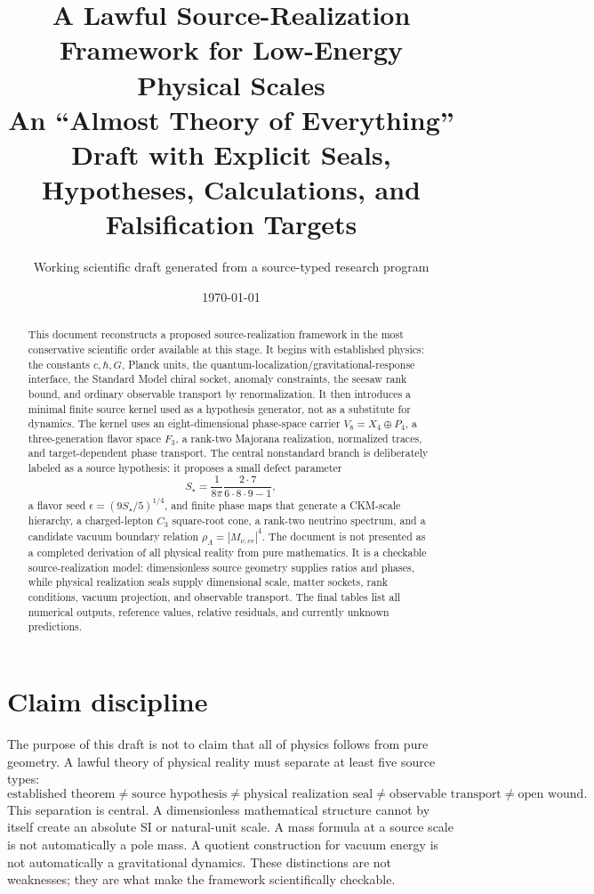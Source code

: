 \documentclass[11pt]{article}
\title{\textbf{A Lawful Source-Realization Framework for Low-Energy Physical Scales}\\
\large An ``Almost Theory of Everything'' Draft with Explicit Seals, Hypotheses, Calculations, and Falsification Targets}
\author{Working scientific draft generated from a source-typed research program}
\date{\today}
\begin{document}
\maketitle

\begin{abstract}
This document reconstructs a proposed source-realization framework in the most conservative scientific order available at this stage. It begins with established physics: the constants \(c,\hbar,G\), Planck units, the quantum-localization/gravitational-response interface, the Standard Model chiral socket, anomaly constraints, the seesaw rank bound, and ordinary observable transport by renormalization. It then introduces a minimal finite source kernel used as a hypothesis generator, not as a substitute for dynamics. The kernel uses an eight-dimensional phase-space carrier \(V_8=X_4\oplus P_4\), a three-generation flavor space \(F_3\), a rank-two Majorana realization, normalized traces, and target-dependent phase transport. The central nonstandard branch is deliberately labeled as a source hypothesis: it proposes a small defect parameter
\[
S_\star=\frac{1}{8\pi}\frac{2\cdot 7}{6\cdot 8\cdot 9-1},
\]
a flavor seed \(\epsilon=(9S_\star/5)^{1/4}\), and finite phase maps that generate a CKM-scale hierarchy, a charged-lepton \(C_3\) square-root cone, a rank-two neutrino spectrum, and a candidate vacuum boundary relation \(\rho_\Lambda=|M_{\nu,ee}|^4\). The document is not presented as a completed derivation of all physical reality from pure mathematics. It is a checkable source-realization model: dimensionless source geometry supplies ratios and phases, while physical realization seals supply dimensional scale, matter sockets, rank conditions, vacuum projection, and observable transport. The final tables list all numerical outputs, reference values, relative residuals, and currently unknown predictions.
\end{abstract}

\tableofcontents
\newpage

\section{Claim discipline}

The purpose of this draft is not to claim that all of physics follows from pure geometry. A lawful theory of physical reality must separate at least five source types:
\[
\boxed{
\text{established theorem}\neq
\text{source hypothesis}\neq
\text{physical realization seal}\neq
\text{observable transport}\neq
\text{open wound}.
}
\]
This separation is central. A dimensionless mathematical structure cannot by itself create an absolute SI or natural-unit scale. A mass formula at a source scale is not automatically a pole mass. A quotient construction for vacuum energy is not automatically a gravitational dynamics. These distinctions are not weaknesses; they are what make the framework scientifically checkable.
\end{document}
